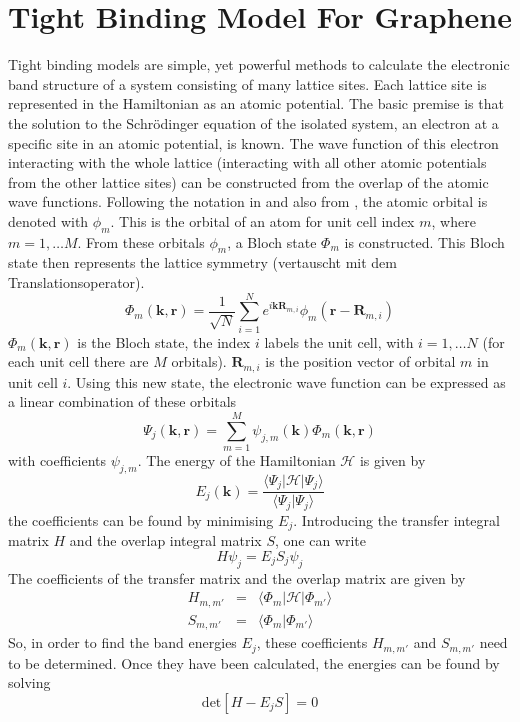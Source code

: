 \section{Tight Binding Model For Graphene}
Tight binding models are simple, yet powerful methods to calculate the electronic band structure of a system consisting of many lattice sites. Each lattice site is represented in the Hamiltonian as an atomic potential. 
The basic premise is that the solution to the Schr\"odinger equation of the isolated system, an electron at a specific site in an atomic potential, is known. The wave function of this electron interacting with the whole lattice (interacting with all other atomic potentials from the other lattice sites) can be constructed from the overlap of the atomic wave functions. 
Following the notation in \cite{McCann2012} and also from \cite{CastroNeto2009}, the atomic orbital is denoted with $\phi_m$. This is the orbital of an atom for unit cell index $m$, where $m = 1, \dots M$. From these orbitals $\phi_m$, a Bloch state $\Phi_m$ is constructed. This Bloch state then represents the lattice symmetry (vertauscht mit dem Translationsoperator).
\begin{equation}
\Phi_m \left( \mathbf{k}, \mathbf{r} \right) = \frac{1}{\sqrt{N}} \sum_{i = 1}^N e^{i \mathbf{k} \mathbf{R}_{m, i}} \phi _m \left( \mathbf{r} - \mathbf{R}_{m, i} \right)
\end{equation}
$\Phi_m \left( \mathbf{k}, \mathbf{r} \right)$ is the Bloch state, the index $i$ labels the unit cell, with $i = 1, \dots N$ (for each unit cell there are $M$ orbitals). $\mathbf{R}_{m, i}$ is the position vector of orbital $m$ in unit cell $i$. Using this new state, the electronic wave function can be expressed as a linear combination of these orbitals
\begin{equation}
\Psi_j \left( \mathbf{k}, \mathbf{r} \right) = \sum_{m=1}^M \psi_{j, m} \left( \mathbf{k} \right) \Phi_m \left( \mathbf{k}, \mathbf{r} \right) 
\end{equation}
with coefficients $\psi_{j, m}$.
The energy of the Hamiltonian $\mathcal{H}$ is given by 
\begin{equation}
E_j \left( \mathbf{k} \right) = \frac{\langle \Psi_j| \mathcal{H} | \Psi_j \rangle}{\langle \Psi_j | \Psi_j \rangle}
\end{equation}
the coefficients can be found by minimising $E_j$. Introducing the transfer integral matrix $H$ and the overlap integral matrix $S$, one can write
\begin{equation}
H \psi_j =  E_j S_j \psi_j
\end{equation}
The coefficients of the transfer matrix and the overlap matrix are given by
\begin{eqnarray}
H_{m, m'} &=& \langle \Phi_m | \mathcal{H} | \Phi_{m'} \rangle \\
S_{m, m'} &=& \langle \Phi_m | \Phi_{m'}\rangle
\end{eqnarray}
So, in order to find the band energies $E_j$, these coefficients $H_{m, m'}$ and $S_{m, m'}$ need to be determined. Once they have been calculated, the energies can be found by solving
\begin{equation}
\text{det} \left[ H - E_j S \right] = 0
\end{equation}

